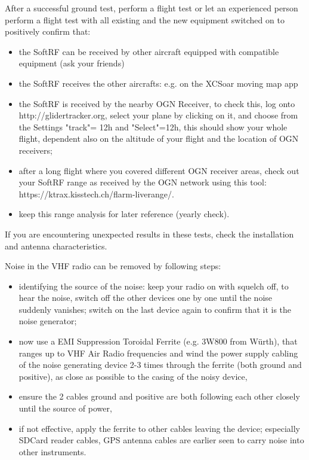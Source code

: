 \documentclass[11pt,a4paper]{article}
\begin{document}
After a successful ground test, perform a flight test or let an experienced person perform a flight test with all existing and the new equipment switched on to positively confirm that:

\begin{itemize}
\item the SoftRF can be received by other aircraft equipped with compatible equipment (ask your friends)
\item the SoftRF receives the other aircrafts: e.g. on the XCSoar moving map app
\item the SoftRF is received by the nearby OGN Receiver, to check this, log onto http://glidertracker.org, select your plane by clicking on it, and choose from the Settings "track"= 12h and "Select"=12h, this should show your whole flight, dependent also on the altitude of your flight and the location of OGN receivers;
\item after a long flight where you covered different OGN receiver areas, check out your SoftRF range as received by the OGN network using this tool: https://ktrax.kisstech.ch/flarm-liverange/.
\item keep this range analysis for later reference (yearly check).
\end{itemize}

If you are encountering unexpected results in these tests, check the installation and antenna characteristics.

Noise in the VHF radio can be removed by following steps:
\begin{itemize}
\item identifying the source of the noise: keep your radio on with squelch off, to hear the noise, switch off the other devices one by one until the noise suddenly vanishes; switch on the last device again to confirm that it is the noise generator;
\item now use a EMI Suppression Toroidal Ferrite (e.g. 3W800 from Würth), that ranges up to VHF Air Radio frequencies and wind the power supply cabling of the noise generating device 2-3 times through the ferrite (both ground and positive), as close as possible to the casing of the noisy device,
\item ensure the 2 cables ground and positive are both following each other closely until the source of power,
\item if not effective, apply the ferrite to other cables leaving the device; especially SDCard reader cables, GPS antenna cables are earlier seen to carry noise into other instruments.
\end{itemize}
\end{document}
